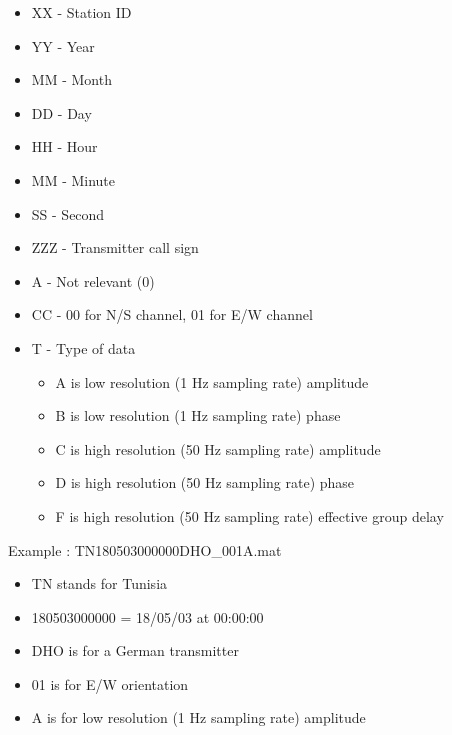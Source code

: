 \documentclass[%
oneside,                 %
final,                   %
10pt]{article}
\begin{document}
\begin{itemize}
\item XX - Station ID

\item YY - Year

\item MM - Month

\item DD - Day

\item HH - Hour

\item MM - Minute

\item SS - Second

\item ZZZ - Transmitter call sign

\item A - Not relevant (0)

\item CC - 00 for N/S channel, 01 for E/W channel

\item T - Type of data
\begin{itemize}

  \item A is low resolution (1 Hz sampling rate) amplitude

  \item B is low resolution (1 Hz sampling rate) phase

  \item C is high resolution (50 Hz sampling rate) amplitude

  \item D is high resolution (50 Hz sampling rate) phase

  \item F is high resolution (50 Hz sampling rate) effective group delay
\end{itemize}

\noindent
\end{itemize}

\noindent
Example : TN180503000000DHO_001A.mat 

\begin{itemize}
\item TN stands for Tunisia

\item 180503000000 = 18/05/03 at 00:00:00

\item DHO is for a German transmitter

\item 01 is for E/W orientation

\item A is for low resolution (1 Hz sampling rate) amplitude
\end{itemize}
\end{document}
